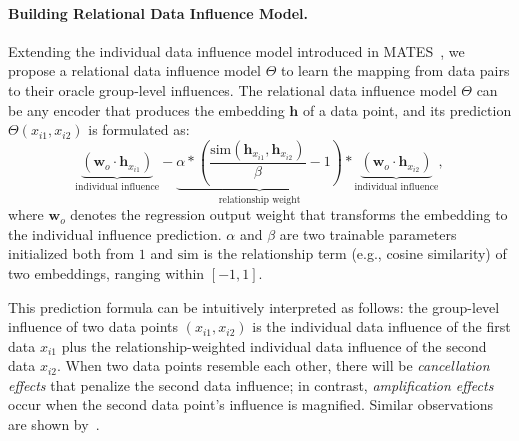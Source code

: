 \paragraph{Building Relational Data Influence Model.} Extending the individual data influence model introduced in MATES~\cite{yu2024mates}, we propose a relational data influence model $\Theta$ to learn the mapping from data pairs to their oracle group-level influences. The relational data influence model $\Theta$ can be any encoder that produces the embedding $\textbf{h}$ of a data point, and 
its prediction $\Theta(x_{i1}, x_{i2})$ is formulated as:
\vspace{-0.45em}
\begin{equation*}
\underbrace{(\textbf{w}_o\cdot\textbf{h}_{x_{i1}})}_{\text{individual influence}} - \underbrace{\alpha * (\frac{\text{sim}(\textbf{h}_{x_{i1}},\textbf{h}_{x_{i2}})}{\beta} - 1)}_{\text{relationship weight}} *  \underbrace{(\textbf{w}_o\cdot\textbf{h}_{x_{i2}})}_{\text{individual influence}},
\end{equation*}
where $\textbf{w}_o$ denotes the regression output weight that transforms the embedding to the individual influence prediction. $\alpha$ and $\beta$ are two trainable parameters initialized both from $1$ and $\text{sim}$ is the relationship term (e.g., cosine similarity) of two embeddings, ranging within $[-1, 1]$. 



This prediction formula can be intuitively interpreted as follows: the group-level influence of two data points $(x_{i1}, x_{i2})$ is the individual data influence of the first data $x_{i1}$ plus the relationship-weighted individual data influence of the second data $x_{i2}$. When two data points resemble each other, there will be \textit{cancellation effects} that penalize the second data influence; 
in contrast, \textit{amplification effects} occur when the second data point's influence is magnified.
Similar observations are shown by~\citet{hu2024most}.

